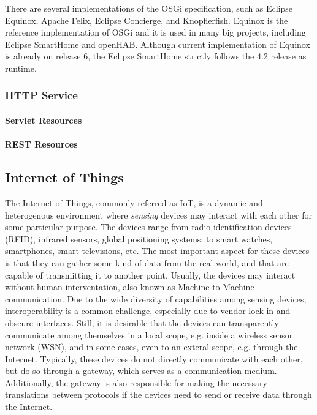 \documentclass[12pt]{article}
\begin{document}
There are several implementations of the OSGi specification, such as Eclipse Equinox, Apache Felix, Eclipse Concierge, and Knopflerfish. Equinox is the reference implementation of OSGi and it is used in many big projects, including Eclipse SmartHome and openHAB. Although current implementation of Equinox is already on release 6, the Eclipse SmartHome strictly follows the 4.2 release as runtime.

\subsubsection{HTTP Service}

\paragraph{Servlet Resources}

\paragraph{REST Resources}

\subsection{Internet of Things}

The Internet of Things, commonly referred as IoT, is a dynamic and heterogenous environment where \emph{sensing} devices may interact with each other for some particular purpose. The devices range from radio identification devices (RFID), infrared sensors, global positioning systems; to smart watches, smartphones, smart televisions, etc. The most important aspect for these devices is that they can gather some kind of data from the real world, and that are capable of transmitting it to another point. Usually, the devices may interact without human interventation, also known as Machine-to-Machine communication. Due to the wide diversity of capabilities among sensing devices, interoperability is a common challenge, especially due to vendor lock-in and obscure interfaces. Still, it is desirable that the devices can transparently communicate among themselves in a local scope, e.g. inside a wireless sensor network (WSN), and in some cases, even to an exteral scope, e.g. through the Internet. Typically, these devices do not directly communicate with each other, but do so through a gateway, which serves as a communication medium. Additionally, the gateway is also responsible for making the necessary translations between protocols if the devices need to send or receive data through the Internet.
\end{document}

